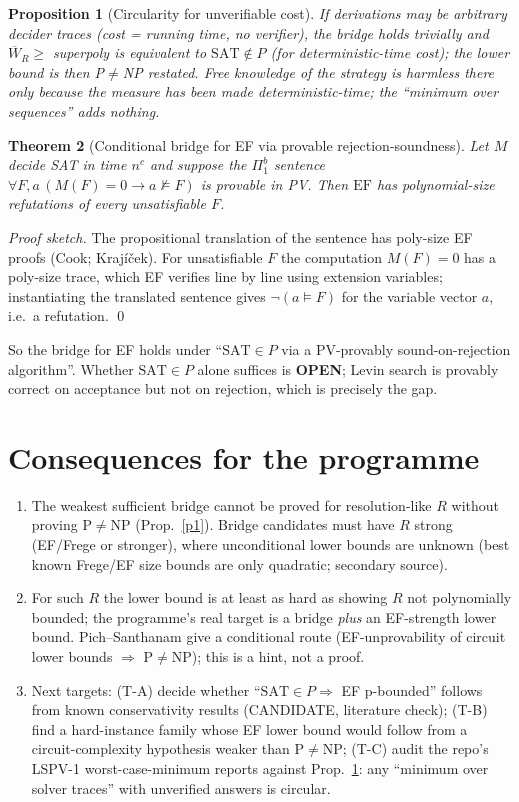 \documentclass[11pt]{article}
\newtheorem{thm}{Theorem}\newtheorem{prop}[thm]{Proposition}
\newcommand{\SAT}{\mathrm{SAT}}\newcommand{\UNSAT}{\mathrm{UNSAT}}
\begin{document}
\begin{prop}[Circularity for unverifiable cost]\label{p3}
If derivations may be arbitrary decider traces (cost = running time, no verifier), the bridge holds trivially and $\overline W_R\ge$ superpoly is equivalent to $\SAT\notin P$ (for deterministic-time cost); the lower bound is then P$\ne$NP restated. Free knowledge of the strategy is harmless there only because the measure has been made deterministic-time; the ``minimum over sequences'' adds nothing.
\end{prop}

\begin{thm}[Conditional bridge for EF via provable rejection-soundness]\label{t4}
Let $M$ decide SAT in time $n^c$ and suppose the $\Pi^b_1$ sentence $\forall F,a\,(M(F)=0\to a\not\models F)$ is provable in PV. Then $\mathrm{EF}$ has polynomial-size refutations of every unsatisfiable $F$.
\end{thm}
\emph{Proof sketch.} The propositional translation of the sentence has poly-size EF proofs (Cook; Krajíček). For unsatisfiable $F$ the computation $M(F)=0$ has a poly-size trace, which EF verifies line by line using extension variables; instantiating the translated sentence gives $\neg(a\models F)$ for the variable vector $a$, i.e.\ a refutation. \qed

\noindent So the bridge for EF holds under ``$\SAT\in P$ via a PV-provably sound-on-rejection algorithm''. Whether $\SAT\in P$ alone suffices is \textbf{OPEN}; Levin search is provably correct on acceptance but not on rejection, which is precisely the gap.

\section{Consequences for the programme}
\begin{enumerate}
\item The weakest sufficient bridge cannot be proved for resolution-like $R$ without proving P$\ne$NP (Prop.~\ref{p1}). Bridge candidates must have $R$ strong (EF/Frege or stronger), where unconditional lower bounds are unknown (best known Frege/EF size bounds are only quadratic; secondary source).
\item For such $R$ the lower bound is at least as hard as showing $R$ not polynomially bounded; the programme's real target is a bridge \emph{plus} an EF-strength lower bound. Pich--Santhanam give a conditional route (EF-unprovability of circuit lower bounds $\Rightarrow$ P$\ne$NP); this is a hint, not a proof.
\item Next targets: (T-A) decide whether ``$\SAT\in P\Rightarrow$ EF p-bounded'' follows from known conservativity results (CANDIDATE, literature check); (T-B) find a hard-instance family whose EF lower bound would follow from a circuit-complexity hypothesis weaker than P$\ne$NP; (T-C) audit the repo's LSPV-1 worst-case-minimum reports against Prop.~\ref{p3}: any ``minimum over solver traces'' with unverified answers is circular.
\end{enumerate}
\end{document}
